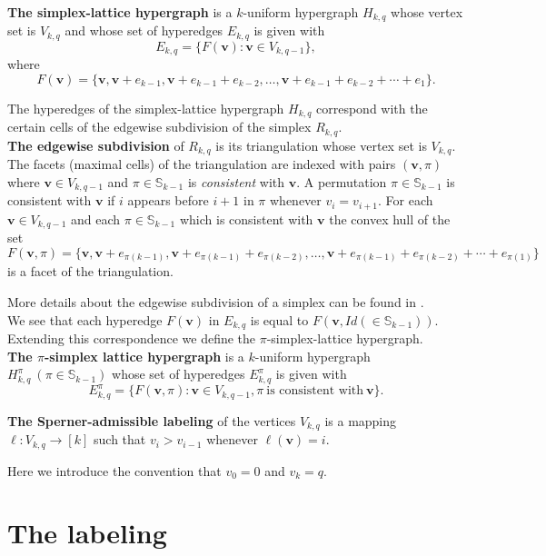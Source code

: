 \documentclass[12pt]{article}
\begin{document}
\textbf{The simplex-lattice hypergraph} is a $k$-uniform hypergraph $H_{k,q}$ whose vertex set is $V_{k,q}$ and whose set of hyperedges $E_{k,q}$ is given with
\[E_{k,q}=\{F(\bm{v}):\bm{v}\in V_{k,q-1}\},\]
where 
\[F(\bm{v})=\{\bm{v},\bm{v}+e_{k-1},\bm{v}+e_{k-1}+e_{k-2},\ldots,\bm{v}+e_{k-1}+e_{k-2}+\cdots+e_1\}.\]

The hyperedges of the simplex-lattice hypergraph $H_{k,q}$ correspond with the certain cells of the edgewise subdivision of the simplex $R_{k,q}$.\\

\textbf{The edgewise subdivision} of $R_{k,q}$ is its triangulation whose vertex set is $V_{k,q}$. The facets (maximal cells) of the triangulation are indexed with pairs $(\bm{v},\pi)$ where $\bm{v}\in V_{k,q-1}$ and $\pi\in\mathbb S_{k-1}$ is \textit{consistent} with $\bm{v}$. A permutation $\pi\in\mathbb S_{k-1}$ is consistent with $\bm{v}$ if $i$ appears before $i+1$ in $\pi$ whenever $v_i=v_{i+1}$. For each $\bm{v}\in V_{k,q-1}$ and each $\pi\in\mathbb S_{k-1}$ which is consistent with $\bm{v}$ the convex hull of the set
\[F(\bm{v},\pi)=\{\bm{v},\bm{v}+e_{\pi(k-1)},\bm{v}+e_{\pi(k-1)}+e_{\pi(k-2)},\ldots,\bm{v}+e_{\pi(k-1)}+e_{\pi(k-2)}+\cdots+e_{\pi(1)}\}\]
is a facet of the triangulation.

More details about the edgewise subdivision of a simplex can be found in \cite{ED}.\\

We see that each hyperedge $F(\bm{v})$ in $E_{k,q}$ is equal to $F(\bm{v},Id(\in\mathbb S_{k-1}))$. Extending this correspondence we define the $\pi$-simplex-lattice hypergraph.\\

\textbf{The $\pi$-simplex lattice hypergraph} is a $k$-uniform hypergraph $H_{k,q}^\pi \ (\pi\in\mathbb S_{k-1})$ whose set of hyperedges $E_{k,q}^\pi$ is given with
\[E_{k,q}^\pi=\{F(\bm{v},\pi):\bm{v}\in V_{k,q-1}, \pi\ \text{is consistent with}\ \bm{v}\}.\]

\textbf{The Sperner-admissible labeling} of the vertices $V_{k,q}$ is a mapping $\ell :V_{k,q}\to[k]$ such that $v_i>v_{i-1}$ whenever $\ell(\bm{v})=i$. 

Here we introduce the convention that $v_0=0$ and $v_k=q$.\\

 




\section{The labeling} 
\end{document}
